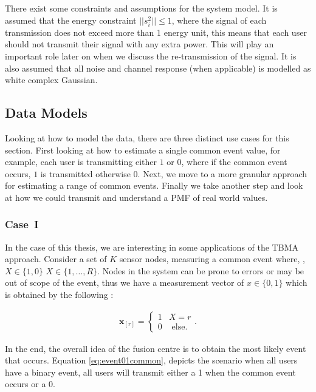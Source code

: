 \documentclass{article}
\begin{document}
There exist some constraints and assumptions for the system model. It is assumed that the energy constraint $||s_{i}^2|| \leq 1$, where the signal of each transmission does not exceed more than 1 energy unit, this means that each user should not transmit their signal with any extra power. This will play an important role later on when we discuss the re-transmission of the signal. It is also assumed that all noise and channel response (when applicable) is modelled as white complex Gaussian.   
\subsection{Data Models}\label{data_models}

Looking at how to model the data, there are three distinct use cases for this section. First looking at how to estimate a single common event value, for example, each user is transmitting either $1$ or $0$, where if the common event occurs, $1$ is transmitted otherwise 0. Next, we move to a more granular approach for estimating a range of common events. Finally we take another step and look at how we could transmit and understand a PMF of real world values. 
\subsubsection{Case~I}

In the case of this thesis, we are interesting in some applications of the TBMA approach. Consider a set of $K$ sensor nodes, measuring a common event where, ,${X \in \{1, 0\}}$ ${X \in \{1, \ldots, R\}}$. Nodes in the system can be prone to errors or may be out of scope of the event, thus we have a measurement vector of ${x \in \{0, 1\}}$ which is obtained by the following :

\begin{align}
    \boldsymbol{x}_{[r]} 
    = 
    \begin{cases}
        1 & X = r
        \\[2ex]
        0 & \text{ else}.
    \end{cases}
    . \label{eq:event01common}
\end{align}

In the end, the overall idea of the fusion centre is to obtain the most likely event that occurs. Equation \ref{eq:event01common}, depicts the scenario when all users have a binary event, all users will transmit either a 1 when the common event occurs or a 0. 
\end{document}
